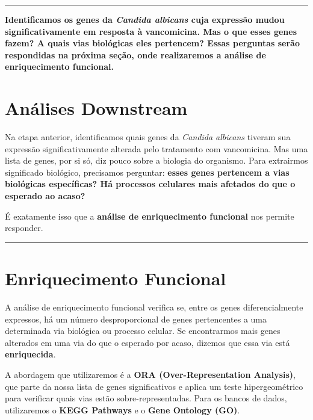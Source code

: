 \documentclass[
  letterpaper,
  DIV=11,
  numbers=noendperiod]{scrreprt}
\begin{document}
\begin{center}\rule{0.5\linewidth}{0.5pt}\end{center}

\textbf{Identificamos os genes da \emph{Candida albicans} cuja expressão
mudou significativamente em resposta à vancomicina. Mas o que esses
genes fazem? A quais vias biológicas eles pertencem? Essas perguntas
serão respondidas na próxima seção, onde realizaremos a análise de
enriquecimento funcional.}


\chapter{Análises Downstream}\label{anuxe1lises-downstream}

Na etapa anterior, identificamos quais genes da \emph{Candida albicans}
tiveram sua expressão significativamente alterada pelo tratamento com
vancomicina. Mas uma lista de genes, por si só, diz pouco sobre a
biologia do organismo. Para extrairmos significado biológico, precisamos
perguntar: \textbf{esses genes pertencem a vias biológicas específicas?
Há processos celulares mais afetados do que o esperado ao acaso?}

É exatamente isso que a \textbf{análise de enriquecimento funcional} nos
permite responder.

\begin{center}\rule{0.5\linewidth}{0.5pt}\end{center}


\chapter{Enriquecimento Funcional}\label{enriquecimento-funcional}

A análise de enriquecimento funcional verifica se, entre os genes
diferencialmente expressos, há um número desproporcional de genes
pertencentes a uma determinada via biológica ou processo celular. Se
encontrarmos mais genes alterados em uma via do que o esperado por
acaso, dizemos que essa via está \textbf{enriquecida}.

A abordagem que utilizaremos é a \textbf{ORA (Over-Representation
Analysis)}, que parte da nossa lista de genes significativos e aplica um
teste hipergeométrico para verificar quais vias estão
sobre-representadas. Para os bancos de dados, utilizaremos o
\textbf{KEGG Pathways} e o \textbf{Gene Ontology (GO)}.
\end{document}
